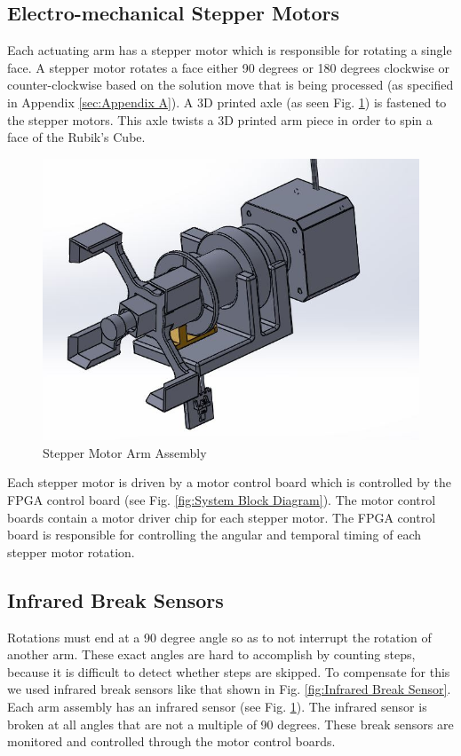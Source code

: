 \documentclass[final, letterpaper, 10 pt, conference, twocolumn]{IEEEtran}
\begin{document}
\subsection{Electro-mechanical Stepper Motors}
\label{sec:Stepper Motors}
Each actuating arm has a stepper motor which is responsible for rotating a single face. A stepper motor rotates a face either 90 degrees or 180 degrees clockwise or counter-clockwise based on the solution move that is being processed (as specified in Appendix \ref{sec:Appendix A}). A 3D printed axle (as seen Fig. \ref{fig:Stepper Motor Arm}) is fastened to the stepper motors. This axle twists a 3D printed arm piece in order to spin a face of the Rubik's Cube.

\begin{figure}[!ht]
\centering
\includegraphics[scale=0.30]{StepperMotorArm.jpg}
\caption{Stepper Motor Arm Assembly}
\label{fig:Stepper Motor Arm}
\end{figure}

Each stepper motor is driven by a motor control board which is controlled by the FPGA control board (see Fig. \ref{fig:System Block Diagram}). The motor control boards contain a motor driver chip for each stepper motor. The FPGA control board is responsible for controlling the angular and temporal timing of each stepper motor rotation.

\subsection{Infrared Break Sensors}
\label{sec:Infrared Break Sensors}
Rotations must end at a 90 degree angle so as to not interrupt the rotation of another arm.  These exact angles are hard to accomplish by counting steps, because it is difficult to detect whether steps are skipped.  To compensate for this we used infrared break sensors like that shown in Fig. \ref{fig:Infrared Break Sensor}. Each arm assembly has an infrared sensor (see Fig. \ref{fig:Stepper Motor Arm}). The infrared sensor is broken at all angles that are not a multiple of 90 degrees. These break sensors are monitored and controlled through the motor control boards.
\end{document}
